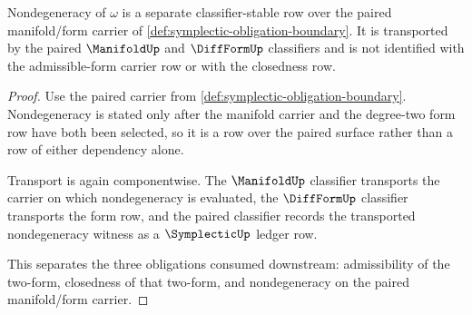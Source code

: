 \begin{theorem}
\label{thm:symplectic-nondegeneracy-stability-obligation}
Nondegeneracy of $\omega$ is a separate classifier-stable row over the paired manifold/form carrier of \autoref{def:symplectic-obligation-boundary}. It is transported by the paired $\ManifoldUp$ and $\DiffFormUp$ classifiers and is not identified with the admissible-form carrier row or with the closedness row.
\end{theorem}
\begin{proof}
Use the paired carrier from \autoref{def:symplectic-obligation-boundary}. Nondegeneracy is stated only after the manifold carrier and the degree-two form row have both been selected, so it is a row over the paired surface rather than a row of either dependency alone.

Transport is again componentwise. The $\ManifoldUp$ classifier transports the carrier on which nondegeneracy is evaluated, the $\DiffFormUp$ classifier transports the form row, and the paired classifier records the transported nondegeneracy witness as a $\SymplecticUp$ ledger row.

This separates the three obligations consumed downstream: admissibility of the two-form, closedness of that two-form, and nondegeneracy on the paired manifold/form carrier.
\end{proof}

